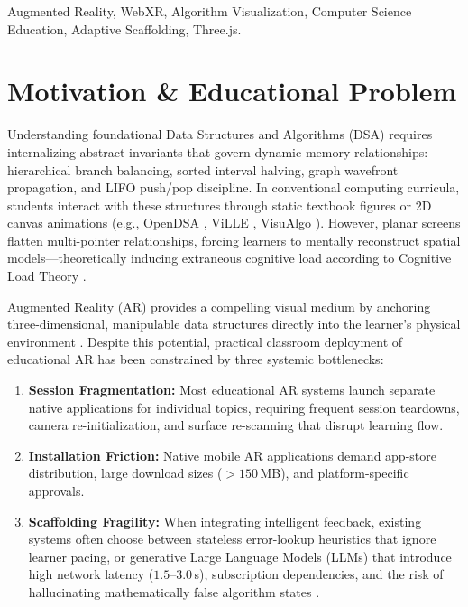 \documentclass[conference]{IEEEtran}
\begin{document}
\begin{IEEEkeywords}
Augmented Reality, WebXR, Algorithm Visualization, Computer Science Education, Adaptive Scaffolding, Three.js.
\end{IEEEkeywords}

\section{Motivation \& Educational Problem}
Understanding foundational Data Structures and Algorithms (DSA) requires internalizing abstract invariants that govern dynamic memory relationships: hierarchical branch balancing, sorted interval halving, graph wavefront propagation, and LIFO push/pop discipline. In conventional computing curricula, students interact with these structures through static textbook figures or 2D canvas animations (e.g., OpenDSA \cite{fouh2012opendsa}, ViLLE \cite{sorva2013review}, VisuAlgo \cite{halim2012visualgo}). However, planar screens flatten multi-pointer relationships, forcing learners to mentally reconstruct spatial models---theoretically inducing extraneous cognitive load according to Cognitive Load Theory \cite{sweller2011cognitive, mayer2002multimedia}.

Augmented Reality (AR) provides a compelling visual medium by anchoring three-dimensional, manipulable data structures directly into the learner's physical environment \cite{billinghurst2001magicbook, fleck2013augmented, radu2014augmented}. Despite this potential, practical classroom deployment of educational AR has been constrained by three systemic bottlenecks:
\begin{enumerate}
    \item \textbf{Session Fragmentation:} Most educational AR systems launch separate native applications for individual topics, requiring frequent session teardowns, camera re-initialization, and surface re-scanning that disrupt learning flow.
    \item \textbf{Installation Friction:} Native mobile AR applications demand app-store distribution, large download sizes ($> 150$\,MB), and platform-specific approvals.
    \item \textbf{Scaffolding Fragility:} When integrating intelligent feedback, existing systems often choose between stateless error-lookup heuristics that ignore learner pacing, or generative Large Language Models (LLMs) that introduce high network latency ($1.5$--$3.0$\,s), subscription dependencies, and the risk of hallucinating mathematically false algorithm states \cite{denny2023conversing}.
\end{enumerate}
\end{document}
